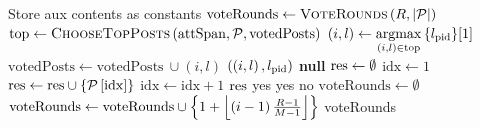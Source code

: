 \begin{algorithm}[H]
  \caption{$\textsc{Vote}\left(\postlist, \mathrm{aux}\right)$}
  \label{alg:steem:vote}
  \begin{algorithmic}[1]
    \State Store aux contents as constants
    \State $\mathrm{voteRounds} \gets \textsc{VoteRounds}\left(\rounds,
    |\postlist|\right)$
      \State $\mathrm{top} \gets \textsc{ChooseTopPosts}\left(\attspan,
      \postlist, \mathrm{votedPosts}\right)$
      \State $\left(i, l\right) \gets \argmax\limits_{\left(i,
      l\right) \in \mathrm{top}}{\lbrace l_{\pid} \rbrace}[1]$
      \State $\mathrm{votedPosts} \gets \mathrm{votedPosts} \: \cup \left(i,
      l\right)$
      \State \Return $\left(\left(i, l\right), l_{\pid}\right)$
    \Else
      \State \Return \textbf{null}
    \EndIf
    \State
      \State $\result \gets \emptyset$
      \State $\mathrm{idx} \gets 1$
          \State $\result \gets \result \cup \lbrace
          \postlist\left[\mathrm{idx}\right] \rbrace$
        \EndIf
        \State $\mathrm{idx} \gets \mathrm{idx} + 1$
      \EndWhile
      \State \Return $\result$
    \EndFunction
    \State
    \label{alg:steem:vote:votethisround}
      \If{$\rounds < \postlen$}
        \State \Return yes
        \State \Return yes
      \Else
        \State \Return no
      \EndIf
    \EndFunction
    \State
    \label{alg:steem:vote:voterounds:start}
      \State $\mathrm{voteRounds} \gets \emptyset$
        \State $\mathrm{voteRounds} \gets \mathrm{voteRounds} \cup \left\{1 +
        \floor*{\left(i - 1\right)\frac{\rounds - 1}{\postlen - 1}}\right\}$
      \EndFor
      \State \Return voteRounds
    \EndFunction
    \label{alg:steem:vote:voterounds:end}
  \end{algorithmic}
\end{algorithm}
